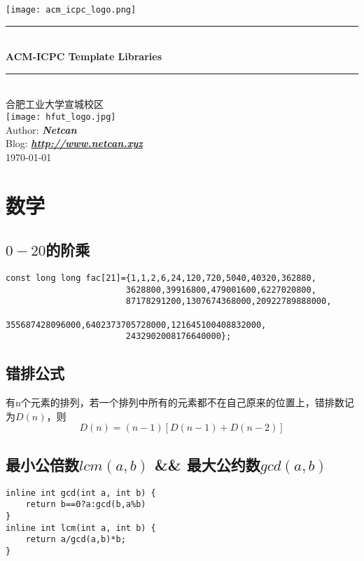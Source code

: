 \documentclass[a4paper]{ctexrep}
\newcommand{\HRule}{\rule{\linewidth}{0.5mm}} %
\begin{document}
\begin{titlepage}
\begin{center}
\texttt{[image: acm\_icpc\_logo.png]}\\[0.5cm]
\HRule\\[0.4cm]
{\huge \bfseries ACM-ICPC Template Libraries}\\[0.2cm]
\HRule\\[1.5cm]
\textsc{\large 合肥工业大学宣城校区}\\[1cm]
\texttt{[image: hfut\_logo.jpg]}\\[0.5cm]
Author: \textbf{\emph{Netcan}}\\
Blog: \textbf{\emph{\url{http://www.netcan.xyz}}}\\
{\large \today}\\[2cm]
\end{center}
\end{titlepage}

\tableofcontents

\chapter{数学}
\section{$0-20$的阶乘}
\begin{lstlisting}
const long long fac[21]={1,1,2,6,24,120,720,5040,40320,362880,
						3628800,39916800,479001600,6227020800,
						87178291200,1307674368000,20922789888000,
						355687428096000,6402373705728000,121645100408832000,
						2432902008176640000};
\end{lstlisting}
\section{错排公式}
有n个元素的排列，若一个排列中所有的元素都不在自己原来的位置上，错排数记为$D(n)$，则
$$D(n) = (n-1)[D(n-1)+D(n-2)]$$
\section{最小公倍数$lcm(a,b)$ \&\& 最大公约数$gcd(a,b)$}
\begin{lstlisting}
inline int gcd(int a, int b) {
	return b==0?a:gcd(b,a%b)
}
inline int lcm(int a, int b) {
	return a/gcd(a,b)*b;
}
\end{lstlisting}
\end{document}
